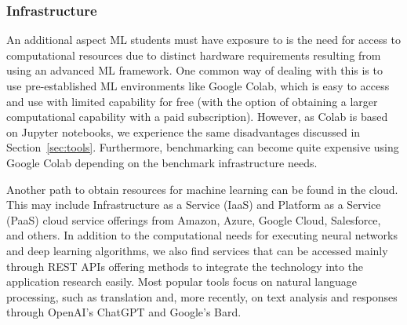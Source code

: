 \documentclass[utf8]{FrontiersinVancouver} %
\begin{document}
\subsubsection{Infrastructure}

An additional aspect ML students must have exposure to is the need for access to computational resources due to distinct hardware requirements resulting from using an advanced ML framework. One common way of dealing with this is to use pre-established ML environments like Google Colab, which is easy to access and use with limited capability for free (with the option of obtaining a larger computational capability with a paid subscription).  However, as Colab is based on Jupyter notebooks, we experience the same disadvantages discussed in Section~\ref{sec:tools}. Furthermore, benchmarking can become quite expensive using Google Colab depending on the benchmark infrastructure needs.

Another path to obtain resources for machine learning can be found in the cloud. This may include Infrastructure as a Service (IaaS) and Platform as a Service (PaaS) cloud service offerings from Amazon, Azure, Google Cloud, Salesforce, and others. In addition to the computational needs for executing neural networks and deep learning algorithms, we also find services that can be accessed mainly through REST APIs offering methods to integrate the technology into the application research easily. Most popular tools focus on natural language processing, such as translation and, more recently, on text analysis and responses through OpenAI's ChatGPT and Google's Bard.
\end{document}
